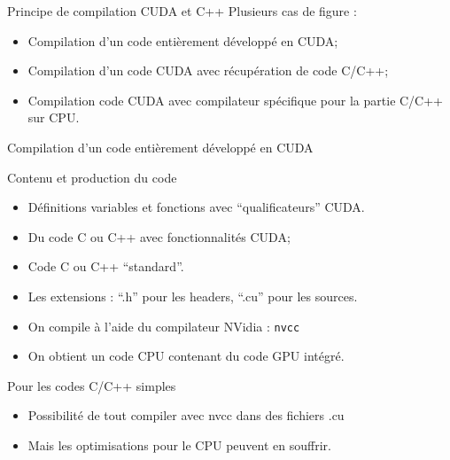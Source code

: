 \documentclass[handout,francais]{beamer}
\begin{document}
\begin{frame}[fragile]{Principe de compilation CUDA et C++}
 Plusieurs cas de figure :

\begin{itemize}
\item Compilation d'un code entièrement développé en CUDA;
\item Compilation d'un code CUDA avec récupération de code C/C++;
\item Compilation code CUDA avec compilateur spécifique pour 
  la partie C/C++ sur CPU.
\end{itemize}

\end{frame}



\begin{frame}{Compilation d'un code entièrement développé en CUDA}

  \begin{exampleblock}{Contenu et production du code}
    \begin{itemize}
    \item Définitions variables et fonctions avec ``qualificateurs''
      CUDA.
    \item Du code C ou C++ avec fonctionnalités CUDA;
    \item Code C ou C++ ``standard''.
    \item Les extensions : ``.h'' pour les headers, ``.cu'' pour les sources.
    \item On compile à l'aide du compilateur NVidia : \texttt{nvcc}
    \item On obtient un code CPU contenant du code GPU intégré.
    \end{itemize}
  \end{exampleblock}

  \begin{alertblock}{Pour les codes C/C++ simples}
    \begin{itemize}
    \item Possibilité de tout compiler avec nvcc dans des fichiers .cu
    \item Mais les optimisations pour le CPU peuvent en souffrir.
    \end{itemize}
  \end{alertblock}
\end{frame}
\end{document}
